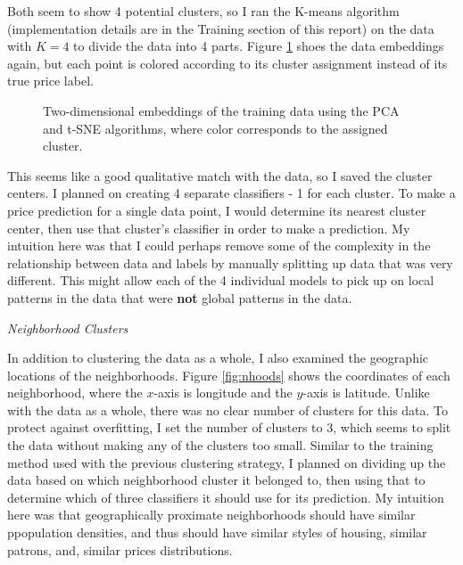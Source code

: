 \documentclass{ws-ijprai}
\newcommand{\subsubheader}[1]{\smallskip\begin{center}\textit{#1}\end{center}}
\begin{document}
Both seem to show 4 potential clusters, so I ran the K-means algorithm (implementation details are in the Training section of this report) on the data with $K=4$ to divide the data into 4 parts. Figure \ref{fig:clusters} shoes the data embeddings again, but each point is colored according to its cluster assignment instead of its true price label. 
\begin{figure}[H]
  \centering
  \caption{Two-dimensional embeddings of the training data using the PCA and t-SNE algorithms, where color corresponds to the assigned cluster.}
  \label{fig:clusters}
\end{figure}

This seems like a good qualitative match with the data, so I saved the cluster centers. I planned on creating 4 separate classifiers - 1 for each cluster. To make a price prediction for a single data point, I would determine its nearest cluster center, then use that cluster's classifier in order to make a prediction. My intuition here was that I could perhaps remove some of the complexity in the relationship between data and labels by manually splitting up data that was very different. This might allow each of the 4 individual models to pick up on local patterns in the data that were \textbf{not} global patterns in the data.

\subsubheader{Neighborhood Clusters}

In addition to clustering the data as a whole, I also examined the geographic locations of the neighborhoods. Figure \ref{fig:nhoods} shows the coordinates of each neighborhood, where the $x$-axis is longitude and the $y$-axis is latitude. Unlike with the data as a whole, there was no clear number of clusters for this data. To protect against overfitting, I set the number of clusters to 3, which seems to split the data without making any of the clusters too small. Similar to the training method used with the previous clustering strategy, I planned on dividing up the data based on which neighborhood cluster it belonged to, then using that to determine which of three classifiers it should use for its prediction. My intuition here was that geographically proximate neighborhoods should have similar ppopulation densities, and thus should have similar styles of housing, similar patrons, and, similar prices distributions.
\end{document}
